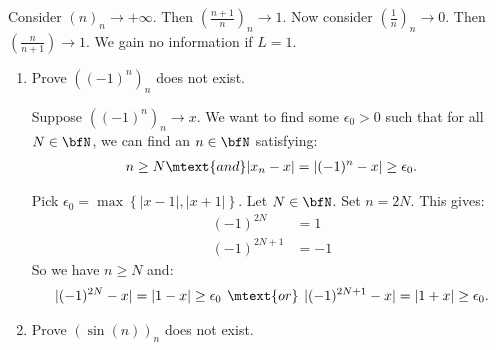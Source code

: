     \begin{remark}
        Consider $(n)_n \rightarrow +\infty$. Then $\left(\frac{n+1}{n}\right)_n \rightarrow 1$. Now consider $\left(\frac{1}{n}\right)_n \rightarrow 0$. Then $\left(\frac{n}{n+1}\right) \rightarrow 1$. We gain no information if $L = 1$.
    \end{remark}

    \begin{example}\label{example:sequence-dne}
        \phantom{a}
        \begin{enumerate}[label = (\arabic*)]
            \item Prove $((-1)^n)_n$ does not exist.
                \begin{solution}
                    Suppose  $((-1)^n)_n \rightarrow x$. We want to find some $\epsilon_0 > 0$ such that for all $N \in \bfN$, we can find an $n \in \bfN$ satisfying:
                        \begin{equation*}
                        \begin{split}
                            n \geq N \mtext{and} |x_n - x| = |(-1)^n - x| \geq \epsilon_0.
                        \end{split}
                        \end{equation*}
                \end{solution}
                Pick $\epsilon_0 = \max\left\{|x-1|,|x+1|\right\}$. Let $N \in \bfN$. Set $n = 2N$. This gives:
                    \begin{equation*}
                    \begin{split}
                        (-1)^{2N} &= 1 \\
                        (-1)^{2N+1} &= -1
                    \end{split}
                    \end{equation*}
                So we have $n \geq N$ and: 
                    \begin{equation*}
                    \begin{split}
                        |(-1)^{2N} - x| = |1 - x| \geq \epsilon_0 \hspace{4pt}\mtext{or}\hspace{4pt} |(-1)^{2N+1} - x| = |1+x| \geq \epsilon_0.
                    \end{split}
                    \end{equation*}

            \item Prove $(\sin(n))_n$ does not exist.
                {\color{red} \begin{solution}
                    
                \end{solution}}
        \end{enumerate}
    \end{example}

